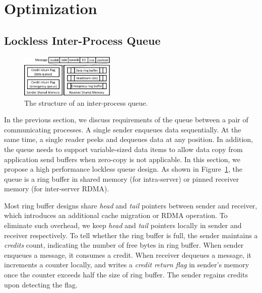 \section{Optimization}
\label{sec:optimization}

\subsection{Lockless Inter-Process Queue}
\label{subsec:lockless-queue}

\begin{figure}[t]
	\centering
	\includegraphics[width=0.4\textwidth]{images/locklessq_new}
	\caption{The structure of an inter-process queue.}
	\vspace{-15pt}
	\label{fig:locklessq-structure}
\end{figure}

In the previous section, we discuss requirements of the queue between a pair of communicating processes. A single sender enqueues data sequentially. At the same time, a single reader peeks and dequeues data at any position. In addition, the queue needs to support variable-sized data items to allow data copy from application send buffers when zero-copy is not applicable. In this section, we propose a high performance lockless queue design. As shown in Figure~\ref{fig:locklessq-structure}, the queue is a ring buffer in shared memory (for intra-server) or pinned receiver memory (for inter-server RDMA).

Most ring buffer designs share \textit{head} and \textit{tail} pointers between sender and receiver, which introduces an additional cache migration or RDMA operation. To eliminate such overhead, we keep \textit{head} and \textit{tail} pointers locally in sender and receiver respectively.
To tell whether the ring buffer is full, the sender maintains a \textit{credits} count, indicating the number of free bytes in ring buffer. When sender enqueues a message, it consumes a credit. When receiver dequeues a message, it increments a counter locally, and writes a \textit{credit return flag} in sender's memory once the counter exceeds half the size of ring buffer. The sender regains credits upon detecting the flag.

